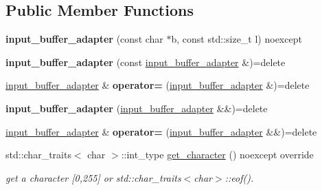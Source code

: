 \subsection*{Public Member Functions}
\begin{DoxyCompactItemize}
\item 
\mbox{\label{classnlohmann_1_1detail_1_1input__buffer__adapter_ad9b912fabdcb53de255e8c444d625ac3}} 
{\bfseries input\+\_\+buffer\+\_\+adapter} (const char $\ast$b, const std\+::size\+\_\+t l) noexcept
\item 
\mbox{\label{classnlohmann_1_1detail_1_1input__buffer__adapter_ada76d7b75c5d6b989af0e18687ef07b6}} 
{\bfseries input\+\_\+buffer\+\_\+adapter} (const \mbox{\hyperlink{classnlohmann_1_1detail_1_1input__buffer__adapter}{input\+\_\+buffer\+\_\+adapter}} \&)=delete
\item 
\mbox{\label{classnlohmann_1_1detail_1_1input__buffer__adapter_a0871125057d993684ba8e45fb2b8a76b}} 
\mbox{\hyperlink{classnlohmann_1_1detail_1_1input__buffer__adapter}{input\+\_\+buffer\+\_\+adapter}} \& {\bfseries operator=} (\mbox{\hyperlink{classnlohmann_1_1detail_1_1input__buffer__adapter}{input\+\_\+buffer\+\_\+adapter}} \&)=delete
\item 
\mbox{\label{classnlohmann_1_1detail_1_1input__buffer__adapter_ab6bc6bb785408b74af284a5b7544d9dc}} 
{\bfseries input\+\_\+buffer\+\_\+adapter} (\mbox{\hyperlink{classnlohmann_1_1detail_1_1input__buffer__adapter}{input\+\_\+buffer\+\_\+adapter}} \&\&)=delete
\item 
\mbox{\label{classnlohmann_1_1detail_1_1input__buffer__adapter_a19bb3ff68048a2fc8ecc41a013af37ae}} 
\mbox{\hyperlink{classnlohmann_1_1detail_1_1input__buffer__adapter}{input\+\_\+buffer\+\_\+adapter}} \& {\bfseries operator=} (\mbox{\hyperlink{classnlohmann_1_1detail_1_1input__buffer__adapter}{input\+\_\+buffer\+\_\+adapter}} \&\&)=delete
\item 
\mbox{\label{classnlohmann_1_1detail_1_1input__buffer__adapter_ae9e195b04f3551fafb0925aafba00124}} 
std\+::char\+\_\+traits$<$ char $>$\+::int\+\_\+type \mbox{\hyperlink{classnlohmann_1_1detail_1_1input__buffer__adapter_ae9e195b04f3551fafb0925aafba00124}{get\+\_\+character}} () noexcept override
\begin{DoxyCompactList}\small\item\em get a character \mbox{[}0,255\mbox{]} or std\+::char\+\_\+traits$<$char$>$\+::eof(). \end{DoxyCompactList}\end{DoxyCompactItemize}


